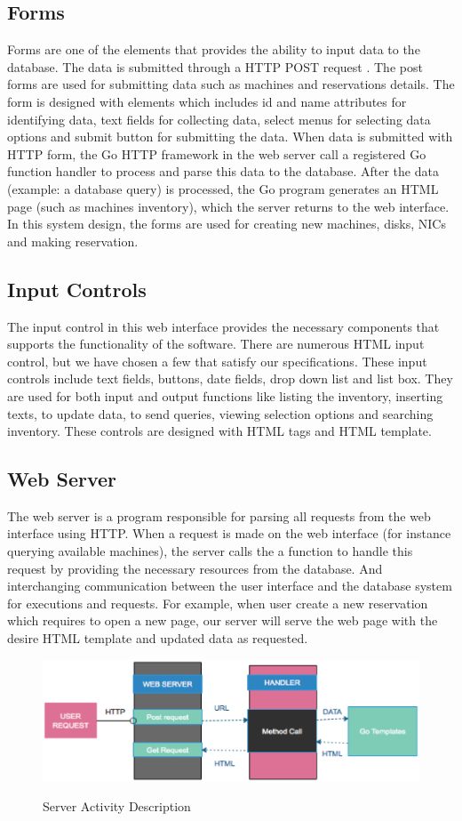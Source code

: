 \subsection*{Forms}
Forms are one  of the elements that provides the ability to input data to the database. The data is submitted through a HTTP POST request \cite{WinNT}. The post forms are used for submitting data such as machines and reservations details. The form is designed with elements which includes id and name attributes for identifying data, text fields for collecting data, select menus for selecting data options and submit button for submitting the data. When data is submitted with HTTP form, the Go HTTP framework in the web server call a registered Go function handler to process and parse this data to the database.  After the data (example: a database query) is processed, the Go program generates an HTML page (such as machines inventory), which the server returns to the web interface. In this system design, the forms are used for creating new machines, disks, NICs and making reservation. 
\subsection*{Input Controls}
The input control in this web interface provides the necessary components that supports the functionality of the software. There are numerous HTML input control, but we have chosen a few that satisfy our specifications. These input controls include text fields, buttons, date fields, drop down list and list box. They are used for both input and output functions like listing the inventory, inserting texts, to update data, to send queries, viewing selection options and searching inventory. These controls are designed with HTML tags and HTML template.
\subsection{Web Server}
The web server is a program responsible for parsing all requests from the web interface using HTTP. When a request is made on the web interface (for instance querying available machines), the server calls the a function to handle this request by providing the necessary resources from the database. And interchanging communication between the user interface and the database system for executions and requests. For example, when user create a new reservation which requires to open a new page, our server will serve the web page with the desire HTML template and updated data as requested.
\begin{figure}[h!]
\includegraphics[width = \linewidth]{server1.eps}
\label{fig:Description of Server Activity} 
\caption{Server Activity Description}
\end{figure}

